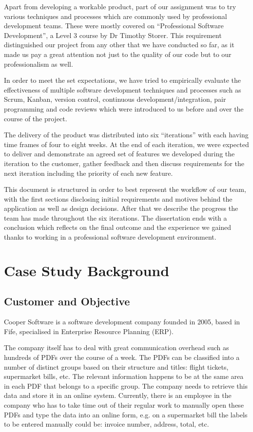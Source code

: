 \documentclass{l3proj}
\begin{document}
Apart from developing a workable product, part of our assignment was to try various techniques and processes which are commonly used by professional development teams. These were mostly covered on ``Professional Software Development'', a Level 3 course by Dr Timothy Storer. This requirement distinguished our project from any other that we have conducted so far, as it made us pay a great attention not just to the quality of our code but to our professionalism as well.

In order to meet the set expectations, we have tried to empirically evaluate the effectiveness of multiple software development techniques and processes such as Scrum, Kanban, version control, continuous development/integration, pair programming and code reviews which were introduced to us before and over the course of the project. 

The delivery of the product was distributed into six ``iterations'' with each having time frames of four to eight weeks. At the end of each iteration, we were expected to deliver and demonstrate an agreed set of features we developed during the iteration to the customer, gather feedback and then discuss requirements for the next iteration including the priority of each new feature.

This document is structured in order to best represent the workflow of our team, with the first sections disclosing initial requirements and motives behind the application as well as design decisions. After that we describe the progress the team has made throughout the six iterations. The dissertation ends with a conclusion which reflects on the final outcome and the experience we gained thanks to working in a professional software development environment.
\section{Case Study Background}
\subsection{Customer and Objective}

Cooper Software is a software development company founded in 2005, based in Fife, specialised in Enterprise Resource Planning (ERP).

The company itself has to deal with great communication overhead such as hundreds of PDFs over the course of a week. The PDFs can be classified into a number of distinct groups based on their structure and titles: flight tickets, supermarket bills, etc. The relevant information happens to be at the same area in each PDF that belongs to a specific group. The company needs to retrieve this data and store it in an online system. Currently, there is an employee in the company who has to take time out of their regular work to manually open these PDFs and type the data into an online form, e.g. on a supermarket bill the labels to be entered manually could be: invoice number, address, total, etc.
\end{document}
